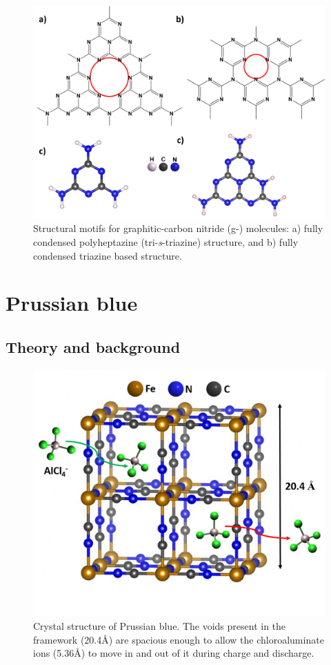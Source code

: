 \begin{figure}[th!]
\centering
\includegraphics[width=\textwidth]{Figures/chap6fig/c3n4}
\caption{Structural motifs for graphitic-carbon nitride (g-) molecules: a) fully condensed polyheptazine (tri-\textit{s}-triazine)  structure, and b) fully condensed triazine based  structure.}
\label{Figures/chap6fig:c3n4}
\end{figure}

\section{Prussian blue}

\subsection{Theory and background}

 \begin{figure}[th!]
  \centering
  \includegraphics[width=\textwidth]{Figures/chap6fig/pbcrys}
    \caption{Crystal structure of Prussian blue. The voids present in the framework (20.4\AA) are spacious enough to allow the chloroaluminate ions (5.36\AA) to move in and out of it during charge and discharge. }
  \label{Figures/chap6fig:pbcrys}
\end{figure}

